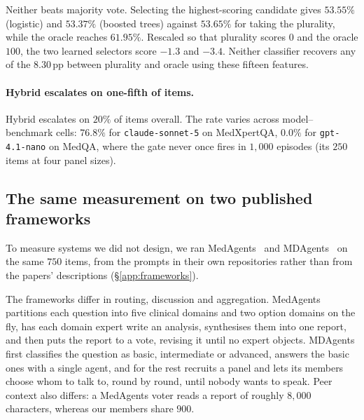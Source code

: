 Neither beats majority vote. Selecting the highest-scoring candidate gives $53.55\%$ (logistic)
and $53.37\%$ (boosted trees) against $53.65\%$ for taking the plurality, while the oracle reaches
$61.95\%$. Rescaled so that plurality scores $0$ and the oracle $100$, the two learned selectors
score $-1.3$ and $-3.4$. Neither classifier recovers any of the $8.30$\,pp between plurality and
oracle using these fifteen features.

\paragraph{Hybrid escalates on one-fifth of items.}
Hybrid escalates on $20\%$ of items overall. The rate varies across model--benchmark cells:
$76.8\%$ for \texttt{claude-sonnet-5} on
MedXpertQA, $0.0\%$ for \texttt{gpt-4.1-nano} on MedQA, where the gate never once fires in
$1{,}000$ episodes (its $250$ items at four panel sizes).

\subsection{The same measurement on two published frameworks}
\label{sec:frameworks}

To measure systems we did not design, we ran
MedAgents~\citep{tang2024medagents} and MDAgents~\citep{kim2024mdagents} on the same
$750$ items, from the prompts in their own repositories rather than from the papers'
descriptions (\S\ref{app:frameworks}).

The frameworks differ in routing, discussion and aggregation. MedAgents
partitions each question into five clinical domains and two option domains on the
fly, has each domain expert write an analysis, synthesises them into one report, and
then puts the report to a vote, revising it until no expert objects. MDAgents first
classifies the question as basic, intermediate or advanced, answers the basic ones
with a single agent, and for the rest recruits a panel and lets its members choose
whom to talk to, round by round, until nobody wants to speak. Peer context also differs:
a MedAgents voter reads a report of roughly $8{,}000$ characters, whereas our members share $900$.


